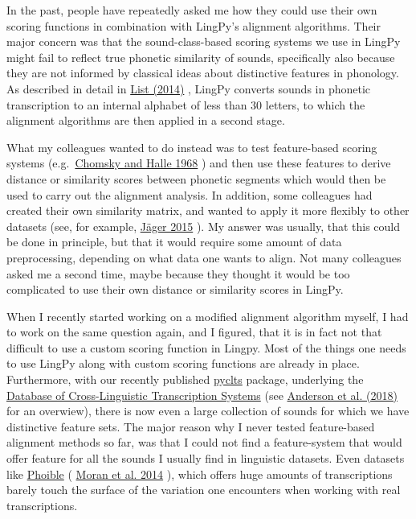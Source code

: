 \documentclass[
  a4paper,
  14pt,
  oneside,
  tablecaptionabove
]{scrbook}
\begin{document}
In the past, people have repeatedly asked me how they could use their
own scoring functions in combination with LingPy's alignment algorithms.
Their major concern was that the sound-class-based scoring systems we
use in LingPy might fail to reflect true phonetic similarity of sounds,
specifically also because they are not informed by classical ideas about
distinctive features in phonology. As described in detail in
\href{http://bibliography.lingpy.org?key=List2014d}{List (2014)} ,
LingPy converts sounds in phonetic transcription to an internal alphabet
of less than 30 letters, to which the alignment algorithms are then
applied in a second stage.

What my colleagues wanted to do instead was to test feature-based
scoring systems
(e.g.~\href{http://bibliography.lingpy.org?key=Chomsky1968}{Chomsky and
Halle 1968} ) and then use these features to derive distance or
similarity scores between phonetic segments which would then be used to
carry out the alignment analysis. In addition, some colleagues had
created their own similarity matrix, and wanted to apply it more
flexibly to other datasets (see, for example,
\href{http://bibliography.lingpy.org?key=Jaeger2015}{Jäger 2015} ). My
answer was usually, that this could be done in principle, but that it
would require some amount of data preprocessing, depending on what data
one wants to align. Not many colleagues asked me a second time, maybe
because they thought it would be too complicated to use their own
distance or similarity scores in LingPy.

When I recently started working on a modified alignment algorithm
myself, I had to work on the same question again, and I figured, that it
is in fact not that difficult to use a custom scoring function in
Lingpy. Most of the things one needs to use LingPy along with custom
scoring functions are already in place. Furthermore, with our recently
published \href{https://github.com/cldf/clts}{pyclts} package,
underlying the \href{https://clts.clld.org}{Database of Cross-Linguistic
Transcription Systems} (see
\href{http://bibliography.lingpy.org?key=Anderson2018}{Anderson et al.
(2018)} for an overwiew), there is now even a large collection of sounds
for which we have distinctive feature sets. The major reason why I never
tested feature-based alignment methods so far, was that I could not find
a feature-system that would offer feature for all the sounds I usually
find in linguistic datasets. Even datasets like
\href{https://phoible.org}{Phoible} (
\href{http://bibliography.lingpy.org?key=Moran2014}{Moran et al. 2014}
), which offers huge amounts of transcriptions barely touch the surface
of the variation one encounters when working with real transcriptions.
\end{document}
